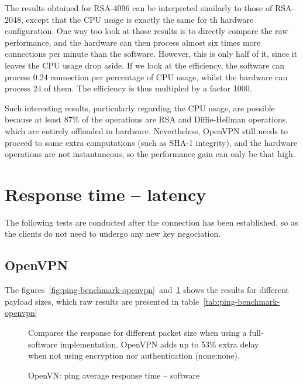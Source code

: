 \noindent The results obtained for RSA-4096 can be interpreted similarly to those of RSA-2048, except that the CPU usage is exactly the same for th hardware configuration.
One way too look at those results is to directly compare the raw performance, and the hardware can then process almost six times more connections per minute than the software.
However, this is only half of it, since it leaves the CPU usage drop aside.
If we look at the efficiency, the software can process 0.24 connection per percentage of CPU usage, whilst the hardware can process 24 of them.
The efficiency is thus multipled by a factor 1000.

Such interesting results, particularly regarding the CPU usage, are possible because at least 87\% of the operations are RSA and Diffie-Hellman operations, which are entirely offloaded in hardware.
Nevertheless, OpenVPN still needs to proceed to some extra computations (such as SHA-1 integrity), and the hardware operations are not instantaneous, so the performance gain can only be that high.












\section{Response time -- latency}
The following tests are conducted after the connection has been established, so as the clients do not need to undergo any new key negociation.

\subsection{OpenVPN}
The figures~\ref{fig:ping-benchmark-openvpn}~and~\ref{fig:ping-benchmark-openvpn-soft} shows the results for different payload sizes, which raw results are presented in table~\ref{tab:ping-benchmark-openvpn}

\begin{figure}[ht]

\caption{OpenVN: ping average response time -- software}{Compares the response for different packet size when using a full-software implementation. OpenVPN adds up to 53\% extra delay when not using encryption nor authentication (none:none).}
\label{fig:ping-benchmark-openvpn-soft}
\end{figure}

